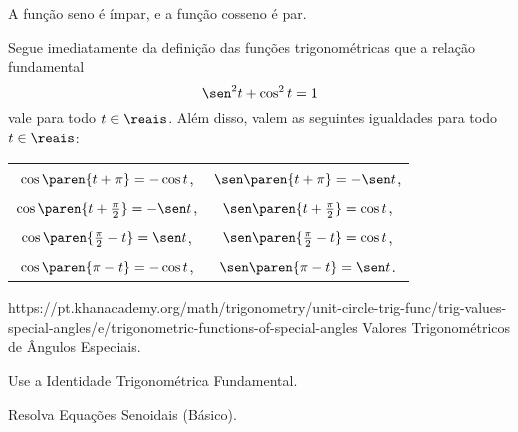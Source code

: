  \begin{proposition}
     A função seno é ímpar, e a função cosseno é par.
 \end{proposition}

 Segue imediatamente da definição das funções trigonométricas que a
relação fundamental $$ \sen^2 t + \cos^2 t = 1$$ vale para todo $t
\in \reais$.
Além disso, valem as seguintes igualdades para todo $t \in \reais$:
\begin{center}
\begin{tabular}{ c c }
    $\cos \paren{t+ \pi} = -\cos t$, & $\sen \paren{t+ \pi} = -\sen t$, \\
    $\cos \paren{t+ \frac {\pi} 2} = -\sen t$, & $\sen \paren{t+ \frac {\pi} 2} = \cos t$, \\
    $\cos \paren{ \frac {\pi} 2 -t} = \sen t$, & $\sen \paren{ \frac {\pi} 2 -t} = \cos t$, \\
    $\cos \paren{ \pi -t} = -\cos t$, & $\sen \paren{ \pi -t} = \sen t$. \\
  \end{tabular}
\end{center}

\begin{onlineact}
    \khan{}https://pt.khanacademy.org/math/trigonometry/unit-circle-trig-func/trig-values-special-angles/e/trigonometric-functions-of-special-angles
    {Valores Trigonométricos de Ângulos Especiais}.
\end{onlineact}

\begin{onlineact}
    {Use a Identidade Trigonométrica Fundamental}.
\end{onlineact}

\begin{onlineact}
    {Resolva Equações Senoidais (Básico)}.
\end{onlineact}
